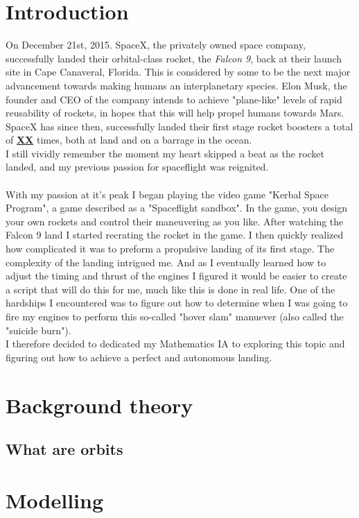 \documentclass[12pt]{article}
\begin{document}
    \tableofcontents
    \thispagestyle{empty}
    \addtocounter{page}{-1}
    

    
    \newpage
    \section{Introduction} %
        On December 21st, 2015. SpaceX, the privately owned space company, successfully landed their orbital-class rocket, the \textit{Falcon 9}, back at their launch site in Cape Canaveral, Florida. 
        This is considered by some to be the next major advancement towards making humans an interplanetary species. Elon Musk, the founder and CEO of the company 
        intends to achieve "plane-like" levels of rapid reusability of rockets, in hopes that this will help propel humans towards Mars. 
    \\
        SpaceX has since then, successfully landed their first stage rocket boosters a total of \textbf{\underline{XX}} times, both at land and on a barrage in the ocean. 
    \\ 
        I still vividly remember the moment my heart skipped a beat as the rocket landed, and my previous passion for spaceflight was reignited.
    \paragraph{}
        With my passion at it's peak I began playing the video game "Kerbal Space Program", a game described as a "Spaceflight sandbox". In the game, you design your own rockets and 
        control their maneuvering as you like. After watching the Falcon 9 land I started recrating the rocket in the game. 
        I then quickly realized how complicated it was to preform a propulsive landing of its first stage. The complexity of the landing intrigued me. 
        And as I eventually learned how to adjust the timing and thrust of the engines I figured it would be easier to create a script that will do this for me, much like this is done in real life.
    \break
        One of the hardships I encountered was to figure out how to determine when I was going to fire my engines to perform this so-called "hover slam" manuever 
        (also called the "suicide burn"). \\
        I therefore decided to dedicated my Mathematics IA to exploring this topic and figuring out how to achieve a perfect and autonomous landing.

    

    \section{Background theory}
        \subsection{What are orbits}
    \section{Modelling}

    
\end{document}
